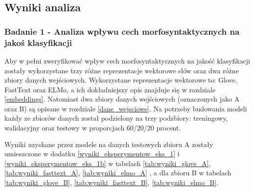 

\subsection{Wyniki analiza}

\subsubsection{Badanie 1 - Analiza wpływu cech morfosyntaktycznych na jakoś klasyfikacji}

Aby w pełni zweryfikować wpływ cech morfosyntaktycznych na jakość klasyfikacji zostały wykorzystane trzy różne reprezentacje wektorowe słów oraz dwa różne zbiory danych wejściowych. Wykorzystane reprezentacje wektorowe to: Glove, FastText oraz ELMo, a ich dokładniejszy opis znajduje się w rozdziale \ref{embeddings}. Natomiast dwa zbiory danych wejściowych (oznaczonych jako A oraz B) są opisane w rozdziale \ref{dane_wejsciowe}. Na potrzeby budowania modeli każdy ze zbiorów danych został podzielony na trzy podzbiory: treningowy, walidacyjny oraz testowy w proporcjach 60/20/20 procent.

Wyniki uzyskane przez modele na danych testowych zbioru A zostały umieszczone w dodatku \ref{wyniki_eksperymentow_eks_1} i \ref{wyniki_eksperymentow_eks_1b} w tabelach \ref{tab:wyniki_glove_A}, \ref{tab:wyniki_fasttext_A}, \ref{tab:wyniki_elmo_A} , a dla zbioru B w tabelach \ref{tab:wyniki_glove_B}, \ref{tab:wyniki_fasttext_B}, \ref{tab:wyniki_elmo_B}.




